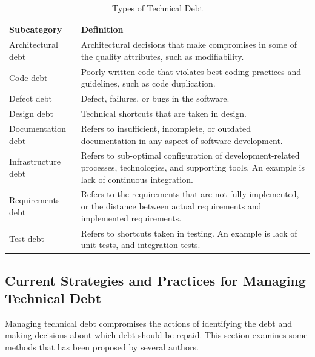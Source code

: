 \begin{table}
	\centering
	\begin{tabular}{ | p{5cm} | p{8cm} |}
	\hline
	\textbf{Subcategory} & \textbf{Definition} \\ \hline
	Architectural debt\cite{li2015systematic,p8-codabux,foser076-brown} & Architectural decisions that make compromises in some of the quality attributes, such as modifiability. \\ \hline
	Code debt\cite{li2015systematic,foser076-brown,tom2013exploration} & Poorly written code that violates best coding practices and guidelines, such as code duplication. \\ \hline
	Defect debt\cite{li2015systematic,tom2013exploration} & Defect, failures, or bugs in the software. \\ \hline
	Design debt\cite{li2015systematic,Zazworka:2011:PDD:1985362.1985372,foser076-brown} & Technical shortcuts that are taken in design.\\ \hline
	Documentation debt\cite{li2015systematic,foser076-brown,Zazworka:2013:CSE:2460999.2461005} & Refers to insufficient, incomplete, or outdated documentation in any aspect of software development.\\ \hline
	Infrastructure debt\cite{li2015systematic,tom2013exploration,p8-codabux} & Refers to sub-optimal configuration of development-related processes, technologies, and supporting tools. An example is lack of continuous integration.\\ \hline
	Requirements debt\cite{li2015systematic,Zazworka:2013:CSE:2460999.2461005} & Refers to the requirements that are not fully implemented, or the distance between actual requirements and implemented requirements.\\ \hline
	Test debt\cite{li2015systematic,Zazworka:2013:CSE:2460999.2461005,foser076-brown} & Refers to shortcuts taken in testing. An example is lack of unit tests, and integration tests.\\
	\hline
	\end{tabular}
	\caption{Types of Technical Debt} \label{tab:subcategories}
\end{table}

\subsection{Current Strategies and Practices for Managing Technical Debt}
Managing technical debt compromises the actions of identifying the debt and making decisions about which debt should be repaid\cite{foser076-brown,krutchen,url-mcconnell}. This section examines some methods that has been proposed by several authors.

